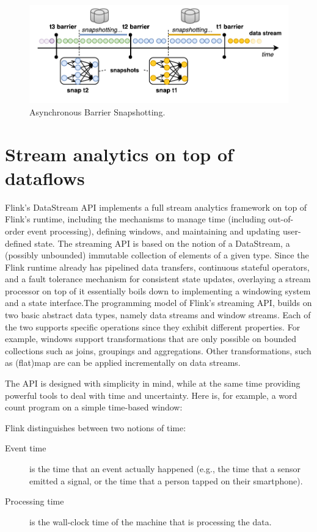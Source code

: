 \documentclass{sig-alternate}
\begin{document}
\begin{figure}[h!]
	\centering  	
  	\includegraphics[width=.45\textwidth]{figs/snaps.pdf}
	\caption{Asynchronous Barrier Snapshotting.}
	\label{fig:FlinkStack}
\end{figure}


\section{Stream analytics on top of \\ dataflows}

Flink's DataStream API implements a full stream analytics framework on top of Flink's runtime, including the mechanisms to manage time (including out-of-order event processing), defining windows, and maintaining and updating user-defined state. The streaming API is based on the notion of a DataStream, a (possibly unbounded) immutable collection of elements of a given type. Since the Flink runtime already has pipelined data transfers, continuous stateful operators, and a fault tolerance mechanism for consistent state updates, overlaying a stream processor on top of it essentially boils down to implementing a windowing system and a state interface.The programming model of Flink's streaming API,  builds on two basic abstract data types, namely data streams and window streams. Each of the two supports specific operations since they exhibit different properties. For example, windows support transformations that are only possible on bounded collections such as joins, groupings and aggregations. Other transformations, such as (flat)map are  can be applied incrementally on data streams.

The API is designed with simplicity in mind, while at the same time providing powerful tools to deal with time and uncertainty. Here is, for example, a word count program on a simple  time-based window:



Flink distinguishes between two notions of time: 
\begin{description}
\item[Event time] is the time that an event actually happened (e.g., the time that a sensor emitted a signal, or the time that a person tapped on their smartphone).
\item[Processing time] is the wall-clock time of the machine that is processing the data.
\end{description}
\end{document}
